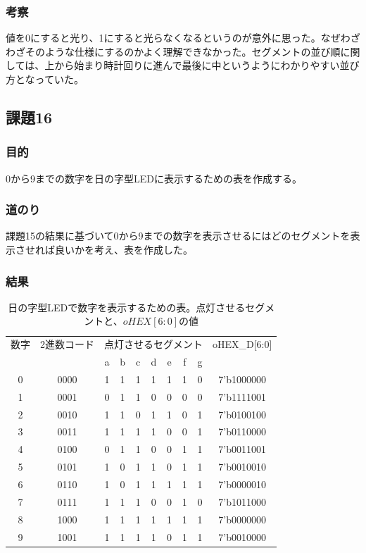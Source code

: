 \documentclass[a4paper]{jarticle}
\begin{document}
\subsubsection{考察}
値を0にすると光り、1にすると光らなくなるというのが意外に思った。なぜわざわざそのような仕様にするのかよく理解できなかった。セグメントの並び順に関しては、上から始まり時計回りに進んで最後に中というようにわかりやすい並び方となっていた。
\subsection{課題16}
\subsubsection{目的}
0から9までの数字を日の字型LEDに表示するための表を作成する。
\subsubsection{道のり}
課題15の結果に基づいて0から9までの数字を表示させるにはどのセグメントを表示させれば良いかを考え、表を作成した。
\subsubsection{結果}
\begin{table}[!h]
	\begin{center}
		\caption{日の字型LEDで数字を表示するための表。点灯させるセグメントと、$oHEX[6:0]$の値}
		\label{Work16Table}
		\begin{tabular}{|c|c|c|c|c|c|c|c|c|c|}
		\hline
		{数字}	&2進数コード	&\multicolumn{7}{|c|}{点灯させるセグメント}		&oHEX\_D[6:0]\\	\cline{3-9}
			&		&a	&b	&c	&d	&e	&f	&g	&\\		\hline
		0	&0000		&1	&1	&1	&1	&1	&1	&0	&7'b1000000\\	\hline
		1	&0001		&0	&1	&1	&0	&0	&0	&0	&7'b1111001\\	\hline
		2	&0010		&1	&1	&0	&1	&1	&0	&1	&7'b0100100\\	\hline
		3	&0011		&1	&1	&1	&1	&0	&0	&1	&7'b0110000\\	\hline
		4	&0100		&0	&1	&1	&0	&0	&1	&1	&7'b0011001\\	\hline
		5	&0101		&1	&0	&1	&1	&0	&1	&1	&7'b0010010\\	\hline
		6	&0110		&1	&0	&1	&1	&1	&1	&1	&7'b0000010\\	\hline
		7	&0111		&1	&1	&1	&0	&0	&1	&0	&7'b1011000\\	\hline
		8	&1000		&1	&1	&1	&1	&1	&1	&1	&7'b0000000\\	\hline
		9	&1001		&1	&1	&1	&1	&0	&1	&1	&7'b0010000\\	\hline
		\end{tabular}
	\end{center}
\end{table}
\end{document}
